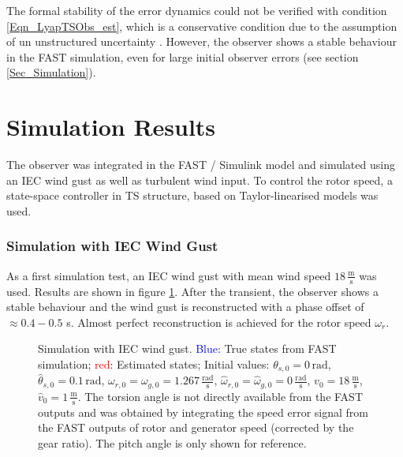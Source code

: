 \documentclass[a4paper]{article}
\newcommand{\regsym}{\textsuperscript{\textregistered}}
\begin{document}
The formal stability of the error dynamics could not be verified with condition \eqref{Eqn_LyapTSObs_est}, which is a conservative condition due to the assumption of un unstructured uncertainty \cite{Lendek:2010}. However, the observer shows a stable behaviour in the FAST simulation, even for large initial observer errors (see section \ref{Sec_Simulation}).




\section{\label{Sec_Simulation}Simulation Results}

The observer was integrated in the FAST / Simulink{\regsym} model and simulated using an IEC wind gust as well as turbulent wind input. To control the rotor speed, a state-space controller in TS structure, based on Taylor-linearised models was used.

\subsubsection{Simulation with IEC Wind Gust}

As a first simulation test, an IEC wind gust with mean wind speed $18\,\frac{\text{m}}{\text{s}}$ was used. Results are shown in figure \ref{Figs_obs_FAST}. 
After the transient, the observer shows a stable behaviour and the wind gust is reconstructed with a phase offset of $\approx 0.4 - 0.5$ s. Almost perfect reconstruction is achieved for the rotor speed $\omega_r$.


\begin{figure}[htbp!]
\centerline{}
\vfil
{}
\hfil
{}
\hfil
{}
\caption{Simulation with IEC wind gust. \textcolor{blue}{Blue}: True states from FAST simulation; \textcolor{red}{red}: Estimated states; Initial values:
			$\theta_{s,0} = 0\,\text{rad}$, $\hat{\theta}_{s,0} = 0.1\,\text{rad}$, $\omega_{r,0} = \omega_{g,0} = 1.267 \,\frac{\text{rad}}{\text{s}}$,
			$\hat{\omega}_{r,0} = \hat{\omega}_{g,0} = 0 \,\frac{\text{rad}}{\text{s}}$, $v_0 = 18 \,\frac{\text{m}}{\text{s}}$,
			$\hat{v}_0 = 1 \,\frac{\text{m}}{\text{s}}$. {The torsion angle is not directly available from the FAST outputs and was obtained by
			integrating the speed error signal from the FAST outputs of rotor and generator speed (corrected by the gear ratio). The pitch angle is only shown for reference.}}
\label{Figs_obs_FAST}
\end{figure}
\end{document}
